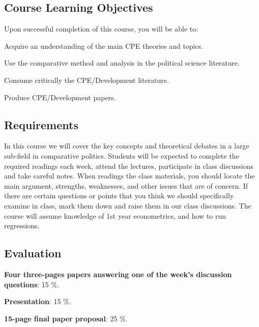 \documentclass[letterpaper]{article}
\renewenvironment{itemize}{
  \begin{list}{}{
    \setlength{\leftmargin}{1.5em}
  }
}{
  \end{list}
}
\begin{document}
\subsection*{Course Learning Objectives}
 
Upon successful completion of this course, you will be able to:

\begin{itemize}
	\item[$\bullet$] Acquire an understanding of the main CPE theories and topics.
	\item[$\bullet$] Use the comparative method and analysis in the political science literature.
	\item[$\bullet$] Consume critically the CPE/Development literature.
	\item[$\bullet$] Produce CPE/Development papers.
\end{itemize}



\subsection*{Requirements}

In this course we will cover the key concepts and theoretical debates in a large sub-field in comparative politics. Students will be expected to complete the required readings each week, attend the lectures, participate in class discussions and take careful notes. When readings the class materials, you should locate the main argument, strengths, weaknesses, and other issues that are of concern. If there are certain questions or points that you think we should specifically examine in class, mark them down and raise them in our class discussions. The course will assume knowledge of 1st year econometrics, and how to run regressions.

\subsection*{Evaluation}


\begin{itemize}
	\item[$\bullet$] {\bf Four three-pages papers answering one of the week's discussion questions}: 15 \%.
	\item[$\bullet$] {\bf Presentation}: 15 \%.
	\item[$\bullet$] {\bf 15-page final paper proposal}: 25 \%.
\end{itemize}
\end{document}
